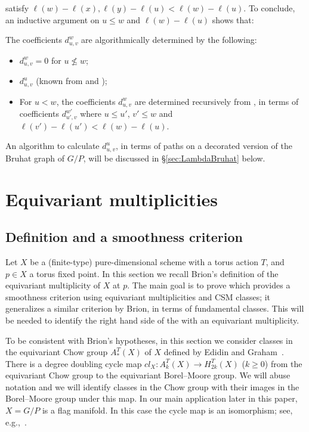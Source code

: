  satisfy $\ell(w)-\ell(x), \ell(y) - \ell(u) < \ell(w)- \ell(u)$.
To conclude, an inductive argument on $u \le w$ and $\ell(w) - \ell(u)$ shows that:
\begin{corol}\label{cor:SMLR} The coefficients $d_{u,v}^w$ are algorithmically determined
	by the following:
	\begin{itemize}
		\item $d_{u,v}^w =0$ for $u \nleq w$;
		
		\item $d_{u,v}^u$ (known from  and );
		
		\item For $u < w$, the coefficients $d_{u,v}^w$ are determined recursively from
		, in terms of coefficients
		$d_{u',v}^{w'}$ where $u \le u'$, $v' \le w$ and $\ell(v') - \ell(u') < \ell(w) - \ell(u)$. 
	\end{itemize}
\end{corol}
An algorithm to calculate $d_{u,v}^u$, in terms of paths on a decorated version of the Bruhat graph of
$G/P$, will be discussed in \S\ref{sec:LambdaBruhat} below.

\section{Equivariant multiplicities} \label{sec:equimult}

\subsection{Definition and a smoothness criterion} Let $X$ be a (finite-type) 
	pure-dimensional scheme with a torus action $T$, and $p \in X$ a
torus fixed point. In this section we recall
Brion's definition of the equivariant multiplicity of $X$ at $p$.
The main goal is to prove 
 which provides a smoothness criterion using
equivariant multiplicities and CSM
classes; it generalizes a similar criterion
by Brion, in terms of fundamental classes. This will be needed to 
identify the right hand side of the  
with an equivariant multiplicity.

{To be consistent
	with Brion's hypotheses, in this section we consider classes in 
	the equivariant Chow group $A_*^T(X)$ of $X$ defined by 
	Edidin and Graham~\cite{edidin.graham:eqchow}.
	There is a degree doubling cycle map $cl_X: A_k^T(X) \to H_{2k}^T(X)$ ($k \ge 0$) from 
	the equivariant Chow group to the equivariant Borel--Moore group. We will abuse notation
	and we will identify classes
	in the Chow group with their images in the Borel--Moore group under this map. 
	In our main application later in this paper,
	$X=G/P$ is a flag manifold. In this case 
	the cycle map is an isomorphism; see, e.g.,~\cite[\S 3.2,~Cor.~2]{brion:eq-chow}.}

